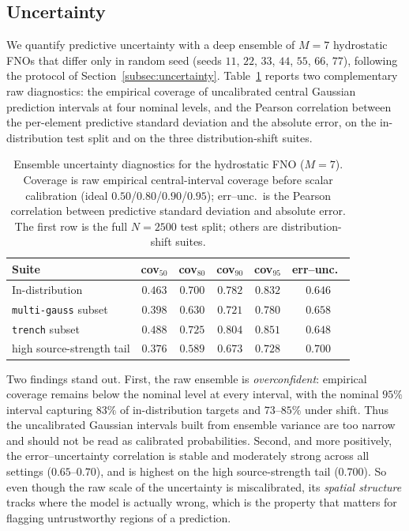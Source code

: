 \subsection{Uncertainty}
\label{subsec:res-uncertainty}

We quantify predictive uncertainty with a deep ensemble of $M = 7$ hydrostatic FNOs that differ only in random seed (seeds $11$, $22$, $33$, $44$, $55$, $66$, $77$), following the protocol of Section~\ref{subsec:uncertainty}. Table~\ref{tab:uncertainty} reports two complementary raw diagnostics: the empirical coverage of uncalibrated central Gaussian prediction intervals at four nominal levels, and the Pearson correlation between the per-element predictive standard deviation and the absolute error, on the in-distribution test split and on the three distribution-shift suites.

\begin{table}[H]
\centering
\caption{Ensemble uncertainty diagnostics for the hydrostatic FNO ($M = 7$). Coverage is raw empirical central-interval coverage before scalar calibration (ideal $0.50$/$0.80$/$0.90$/$0.95$); err--unc.\ is the Pearson correlation between predictive standard deviation and absolute error. The first row is the full $N = 2500$ test split; others are distribution-shift suites.}
\label{tab:uncertainty}
\begin{tabular}{lccccc}
    \toprule
    Suite & cov$_{50}$ & cov$_{80}$ & cov$_{90}$ & cov$_{95}$ & err--unc.\ \\
    \midrule
    In-distribution             & $0.463$ & $0.700$ & $0.782$ & $0.832$ & $0.646$ \\
    \texttt{multi-gauss} subset & $0.398$ & $0.630$ & $0.721$ & $0.780$ & $0.658$ \\
    \texttt{trench} subset      & $0.488$ & $0.725$ & $0.804$ & $0.851$ & $0.648$ \\
    high source-strength tail   & $0.376$ & $0.589$ & $0.673$ & $0.728$ & $0.700$ \\
    \bottomrule
\end{tabular}
\end{table}

Two findings stand out. First, the raw ensemble is \emph{overconfident}: empirical coverage remains below the nominal level at every interval, with the nominal $95\%$ interval capturing $83\%$ of in-distribution targets and $73$--$85\%$ under shift. Thus the uncalibrated Gaussian intervals built from ensemble variance are too narrow and should not be read as calibrated probabilities. Second, and more positively, the error--uncertainty correlation is stable and moderately strong across all settings ($0.65$--$0.70$), and is highest on the high source-strength tail ($0.700$). So even though the raw scale of the uncertainty is miscalibrated, its \emph{spatial structure} tracks where the model is actually wrong, which is the property that matters for flagging untrustworthy regions of a prediction.

